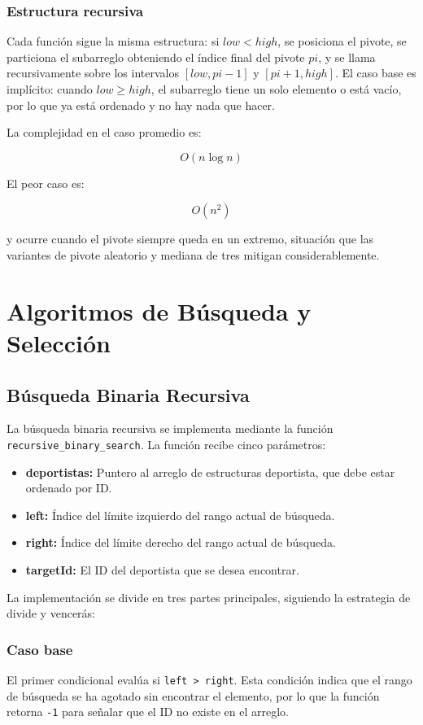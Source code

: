 \subsubsection{Estructura recursiva}
Cada función sigue la misma estructura: si \( low < high \), se posiciona el pivote, se particiona el subarreglo obteniendo el índice final del pivote \( pi \), y se llama recursivamente sobre los intervalos \([low, pi-1]\) y \([pi+1, high]\). El caso base es implícito: cuando \( low \geq high \), el subarreglo tiene un solo elemento o está vacío, por lo que ya está ordenado y no hay nada que hacer.

La complejidad en el caso promedio es:

\[
O(n \log n)
\]

El peor caso es:

\[
O(n^2)
\]

y ocurre cuando el pivote siempre queda en un extremo, situación que las variantes de pivote aleatorio y mediana de tres mitigan considerablemente.


\section{Algoritmos de Búsqueda y Selección}

\subsection{Búsqueda Binaria Recursiva}

La búsqueda binaria recursiva se implementa mediante la función \texttt{recursive\_binary\_search}. La función recibe cinco parámetros:

\begin{itemize}
    \item \textbf{deportistas:} Puntero al arreglo de estructuras deportista, que debe estar ordenado por ID\@.
    \item \textbf{left:} Índice del límite izquierdo del rango actual de búsqueda\@.
    \item \textbf{right:} Índice del límite derecho del rango actual de búsqueda\@.
    \item \textbf{targetId:} El ID del deportista que se desea encontrar\@.
\end{itemize}

La implementación se divide en tres partes principales, siguiendo la estrategia de divide y vencerás:

\subsubsection{Caso base}
El primer condicional evalúa si \texttt{left > right}. Esta condición indica que el rango de búsqueda se ha agotado sin encontrar el elemento, por lo que la función retorna \texttt{-1} para señalar que el ID no existe en el arreglo.

